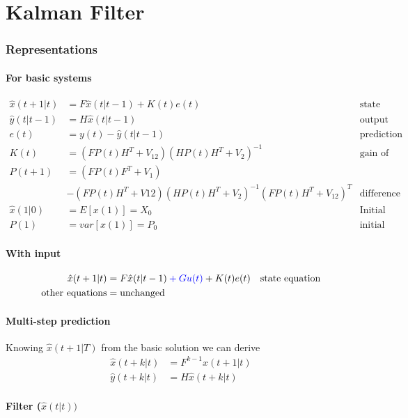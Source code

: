 \documentclass{article}
\let\OldPart\part
\renewcommand{\part}{\newpage\OldPart}
\begin{document}
\part{Kalman Filter}
\section{Representations}
\subsection{For basic systems}
\begin{align*}
\hat{x}(t+1|t)&=F\hat{x}(t|t-1)+K(t)e(t)&\text{state equation}\\
\hat{y}(t|t-1)&=H\hat{x}(t|t-1)&\text{output equation}\\
e(t)&=y(t)-\hat{y}(t|t-1)&\text{prediction error}\\
K(t)&=\left(FP(t)H^T+V_{12}\right)\left(HP(t)H^T+V_2\right)^{-1}&\text{gain of the KF}\\
P(t+1)&=\left(FP(t)F^T+V_1\right)\\
&-\left(FP(t)H^T+V{12}\right)\left(HP(t)H^T+V_2\right)^{-1}\left(FP(t)H^T+V_{12}\right)^T&\text{difference Riccati equation}\\
\hline
\hat{x}(1|0)&=E\left[x(1)\right]=X_0&\text{Initial state}\\
P(1)&=var\left[x(1)\right]=P_0&\text{initial DRE}
\end{align*}
\subsection{With input}
\begin{align*}
\hat{x}(t+1|t)&=F\hat{x}(t|t-1)\color{blue}+Gu(t)\color{black}+K(t)e(t)&\text{state equation}\\
\text{other equations}&=\text{unchanged}
\end{align*}
\subsection{Multi-step prediction}
Knowing $\hat{x}(t+1|T)$ from the basic solution we can derive
\begin{align*}
\hat{x}(t+k|t)&=F^{k-1}\hat{x}(t+1|t)\\
\hat{y}(t+k|t)&=H\hat{x}(t+k|t)
\end{align*}
\subsection{Filter ($\hat{x}(t|t))$}
\end{document}
